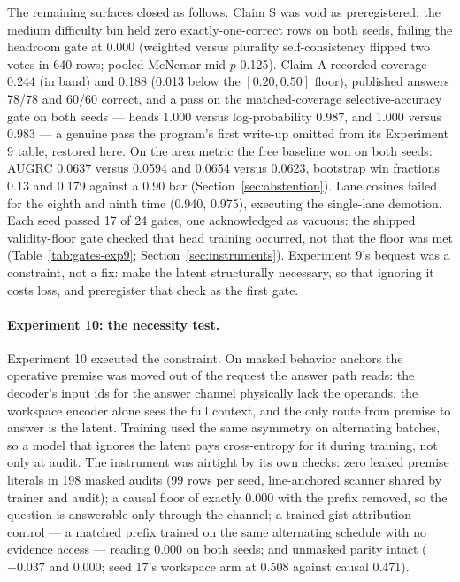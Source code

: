 \documentclass[10pt,a4paper]{article}
\begin{document}
The remaining surfaces closed as follows. Claim S was void as preregistered: the medium difficulty bin held zero exactly-one-correct rows on both seeds, failing the headroom gate at 0.000 (weighted versus plurality self-consistency flipped two votes in 640 rows; pooled McNemar mid-$p$ 0.125). Claim A recorded coverage 0.244 (in band) and 0.188 (0.013 below the $[0.20, 0.50]$ floor), published answers 78/78 and 60/60 correct, and a pass on the matched-coverage selective-accuracy gate on both seeds --- heads 1.000 versus log-probability 0.987, and 1.000 versus 0.983 --- a genuine pass the program's first write-up omitted from its Experiment 9 table, restored here. On the area metric the free baseline won on both seeds: AUGRC \cite{traub2024} 0.0637 versus 0.0594 and 0.0654 versus 0.0623, bootstrap win fractions 0.13 and 0.179 against a 0.90 bar (Section~\ref{sec:abstention}). Lane cosines failed for the eighth and ninth time (0.940, 0.975), executing the single-lane demotion. Each seed passed 17 of 24 gates, one acknowledged as vacuous: the shipped validity-floor gate checked that head training occurred, not that the floor was met (Table~\ref{tab:gates-exp9}; Section~\ref{sec:instruments}). Experiment 9's bequest was a constraint, not a fix: make the latent structurally necessary, so that ignoring it costs loss, and preregister that check as the first gate.

\paragraph{Experiment 10: the necessity test.}
Experiment 10 executed the constraint. On masked behavior anchors the operative premise was moved out of the request the answer path reads: the decoder's input ids for the answer channel physically lack the operands, the workspace encoder alone sees the full context, and the only route from premise to answer is the latent. Training used the same asymmetry on alternating batches, so a model that ignores the latent pays cross-entropy for it during training, not only at audit. The instrument was airtight by its own checks: zero leaked premise literals in 198 masked audits (99 rows per seed, line-anchored scanner shared by trainer and audit); a causal floor of exactly 0.000 with the prefix removed, so the question is answerable only through the channel; a trained gist attribution control --- a matched prefix trained on the same alternating schedule with no evidence access --- reading 0.000 on both seeds; and unmasked parity intact ($+0.037$ and 0.000; seed 17's workspace arm at 0.508 against causal 0.471).
\end{document}
